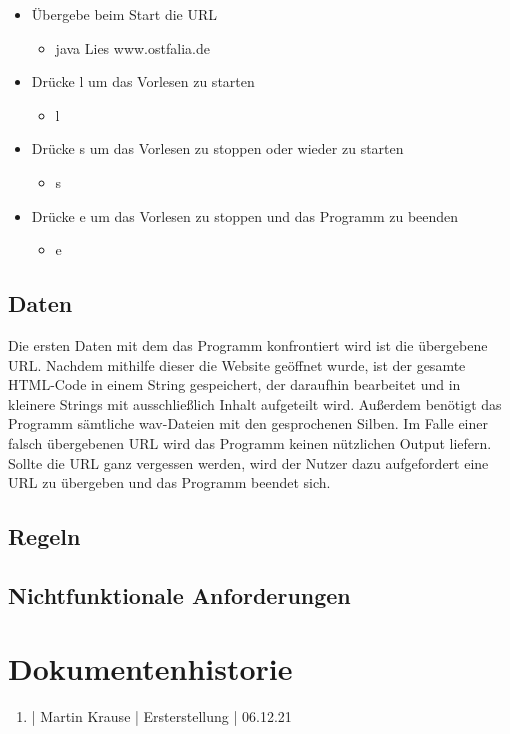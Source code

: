 \documentclass[11pt]{scrartcl}
\begin{document}
\begin{itemize}
	\item Übergebe beim Start die URL
\begin{itemize}
	\item java Lies www.ostfalia.de
\end{itemize}
\end{itemize}

\begin{itemize}
	\item Drücke l um das Vorlesen zu starten
\begin{itemize}
	\item l
\end{itemize}
\end{itemize}

\begin{itemize}
	\item Drücke s um das Vorlesen zu stoppen oder wieder zu starten
\begin{itemize}
	\item s
\end{itemize}
\end{itemize}

\begin{itemize}
	\item Drücke e um das Vorlesen zu stoppen und das Programm zu beenden
\begin{itemize}
	\item e
\end{itemize}
\end{itemize}

\subsection{Daten}
Die ersten Daten mit dem das Programm konfrontiert wird ist die übergebene URL. Nachdem mithilfe dieser
die Website geöffnet wurde, ist der gesamte HTML-Code in einem String gespeichert, der daraufhin bearbeitet
und in kleinere Strings mit ausschließlich Inhalt aufgeteilt wird. Außerdem benötigt das Programm sämtliche
wav-Dateien mit den gesprochenen Silben. Im Falle einer falsch übergebenen URL wird das Programm keinen nützlichen Output liefern. Sollte die URL ganz vergessen werden, wird der Nutzer dazu aufgefordert eine URL zu übergeben und das Programm beendet sich.


\subsection{Regeln}


\subsection{Nichtfunktionale Anforderungen}


\section{Dokumentenhistorie}

\begin{enumerate}
	\item | Martin Krause | Ersterstellung | 06.12.21
\end{enumerate}
 
\end{document}
